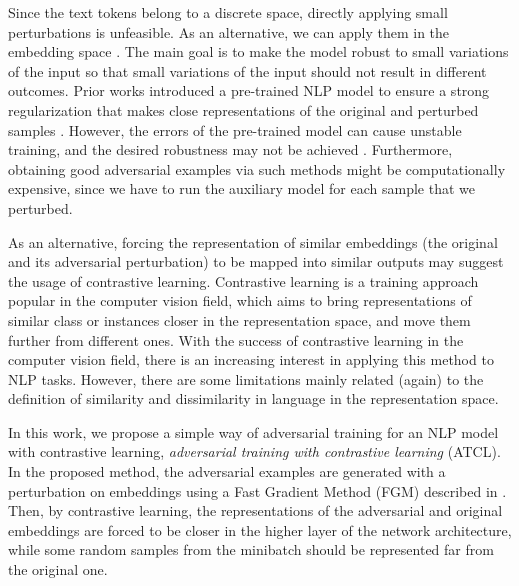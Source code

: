 \documentclass[letterpaper]{article} %
\begin{document}
Since the text tokens belong to a discrete space, directly applying small perturbations is unfeasible. As an alternative, we can apply them in the embedding space \cite{cheng2018towards, cheng2019robust}.
The main goal is to make the model robust to small variations of the input so that small variations of the input should not result in different outcomes. 
Prior works introduced a pre-trained NLP model to ensure a strong regularization that makes close representations of the original and perturbed samples \cite{cheng2018towards, cheng2019robust}. However, the errors of the pre-trained model can cause unstable training, and the desired robustness may not be achieved \cite{zhang2020adversarial}. Furthermore, obtaining good adversarial examples via such methods might be computationally expensive, since we have to run the auxiliary model for each sample that we perturbed. 

As an alternative, forcing the representation of similar embeddings (the original and its adversarial perturbation) to be mapped into similar outputs may suggest the usage of contrastive learning. Contrastive learning \cite{chopra2005learning} is a training approach popular in the computer vision field, which aims to bring representations of similar class or instances closer in the representation space, and move them further from different ones. 
With the success of contrastive learning in the computer vision field, there is an increasing interest in applying this method to NLP tasks. However, there are some limitations mainly related (again) to the definition of similarity and dissimilarity in language \cite{rethmeier2020long} in the representation space.

In this work, we propose a simple way of adversarial training for an NLP model with contrastive learning, {\em adversarial training with contrastive learning} (ATCL). In the proposed method, the adversarial examples are generated with a perturbation on embeddings using a Fast Gradient Method (FGM) described in \cite{miyato2016adversarial}. Then, by contrastive learning, the representations of the adversarial and original embeddings are forced to be closer in the higher layer of the network architecture, while some random samples from the minibatch should be represented far from the original one. 
\end{document}
